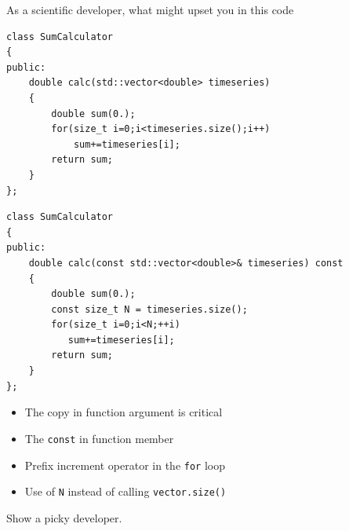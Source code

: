 \documentclass[answers]{exam}
\begin{document}
\begin{questions}
\question As a scientific developer, what might upset you in this code 
\begin{lstlisting}
class SumCalculator
{
public:
	double calc(std::vector<double> timeseries)
	{
		double sum(0.);
		for(size_t i=0;i<timeseries.size();i++)
		    sum+=timeseries[i];
		return sum;
	}
};
\end{lstlisting}
\begin{solution}[.2in] 
\begin{lstlisting}
class SumCalculator
{
public:
	double calc(const std::vector<double>& timeseries) const
	{
		double sum(0.);
		const size_t N = timeseries.size();
		for(size_t i=0;i<N;++i)
		   sum+=timeseries[i];
		return sum;
	}
};
\end{lstlisting}
\begin{itemize}
	\item The copy in function argument is critical
	\item The \lstinline{const} in function member
	\item Prefix increment operator in the \lstinline{for} loop
	\item Use of \lstinline{N} instead of calling \lstinline{vector.size()}
\end{itemize}
Show a picky developer.
\end{solution}

\end{questions}
\fi
%
%
\end{document}
